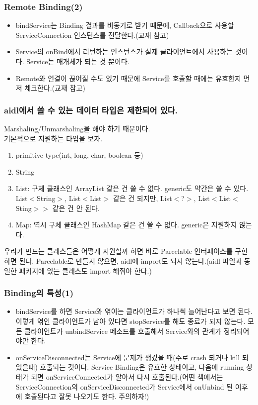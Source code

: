 \documentclass{beamer}
\begin{document}
\begin{frame}
\frametitle{Remote Binding(2)}
\begin{itemize}
\item bindService는 Binding 결과를 비동기로 받기 때문에, Callback으로 사용할 ServiceConnection 인스턴스를 전달한다.(교재 참고)
\item Service의 onBind에서 리턴하는 인스턴스가 실제 클라이언트에서 사용하는 것이다. Service는 매개체가 되는 것 뿐이다.
\item Remote와 연결이 끊어질 수도 있기 때문에 Service를 호출할 때에는 유효한지 먼저 체크한다.(교재 참고)
\end{itemize}
\end{frame}

\begin{frame}
\frametitle{aidl에서 쓸 수 있는 데이터 타입은 제한되어 있다.}
Marshaling/Unmarshaling을 해야 하기 때문이다.\\
기본적으로 지원하는 타입을 보자. 
\begin{enumerate}
\item primitive type(int, long, char, boolean 등)
\item String
\item List: 구체 클래스인 ArrayList 같은 건 쓸 수 없다. generic도 약간은 쓸 수 있다. List$<$String$>$, List$<$List$>$ 같은 건 되지만, List$<$?$>$, List$<$List$<$Sting$>>$ 같은 건 안 된다.
\item Map: 역시 구체 클래스인 HashMap 같은 건 쓸 수 없다. generic은 지원하지 않는다.
\end{enumerate}

우리가 만드는 클래스들은 어떻게 지원할까 하면 바로 Parcelable 인터페이스를 구현하면 된다. Parcelable로 만들지 않으면, aidl에 import도 되지 않는다.(aidl 파일과 동일한 패키지에 있는 클래스도 import 해줘야 한다.)\\
\end{frame}

\begin{frame}
\frametitle{Binding의 특성(1)}
\begin{itemize}
\item bindService를 하면 Service와 엮이는 클라이언트가 하나씩 늘어난다고 보면 된다. 이렇게 엮인 클라이언트가 남아 있다면 stopService를 해도 종료가 되지 않는다. 모든 클라이언트가 unbindService 메소드를 호출해서 Service와의 관계가 정리되어야만 한다.
\item onServiceDisconnected는 Service에 문제가 생겼을 때(주로 crash 되거나 kill 되었을때) 호출되는 것이다. Service Binding은 유효한 상태이고, 다음에 running 상태가 되면 onServiceConnected가 알아서 다시 호출된다.(어떤 책에서는 ServiceConnection의 onServiceDisconnected가 Service에서 onUnbind 된 이후에 호출된다고 잘못 나오기도 한다. 주의하자!)
\end{itemize}
\end{frame}
\end{document}
